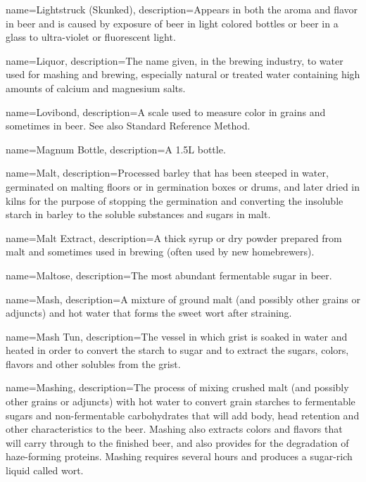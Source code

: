 {
  name={Lightstruck (Skunked)},
  description={Appears in both the aroma and flavor in beer and is caused by exposure of beer in light colored bottles or beer in a glass to ultra-violet or fluorescent light.}
  }

{
  name={Liquor},
  description={The name given, in the brewing industry, to water used for mashing and brewing, especially natural or treated water containing high amounts of calcium and magnesium salts.}
  }

{
  name={Lovibond},
  description={A scale used to measure color in grains and sometimes in beer. See also Standard Reference Method.}
  }

{
  name={Magnum Bottle},
  description={A 1.5L bottle.}
  }

{
  name={Malt},
  description={Processed barley that has been steeped in water, germinated on malting floors or in germination boxes or drums, and later dried in kilns for the purpose of stopping the germination and converting the insoluble starch in barley to the soluble substances and sugars in malt.}
  }

{
  name={Malt Extract},
  description={A thick syrup or dry powder prepared from malt and sometimes used in brewing (often used by new homebrewers).}
  }

{
  name={Maltose},
  description={The most abundant fermentable sugar in beer.}
  }

{
  name={Mash},
  description={A mixture of ground malt (and possibly other grains or adjuncts) and hot water that forms the sweet wort after straining.}
  }

{
  name={Mash Tun},
  description={The vessel in which grist is soaked in water and heated in order to convert the starch to sugar and to extract the sugars, colors, flavors and other solubles from the grist.}
  }

{
  name={Mashing},
  description={The process of mixing crushed malt (and possibly other grains or adjuncts) with hot water to convert grain starches to fermentable sugars and non-fermentable carbohydrates that will add body, head retention and other characteristics to the beer. Mashing also extracts colors and flavors that will carry through to the finished beer, and also provides for the degradation of haze-forming proteins. Mashing requires several hours and produces a sugar-rich liquid called wort.}
  }

